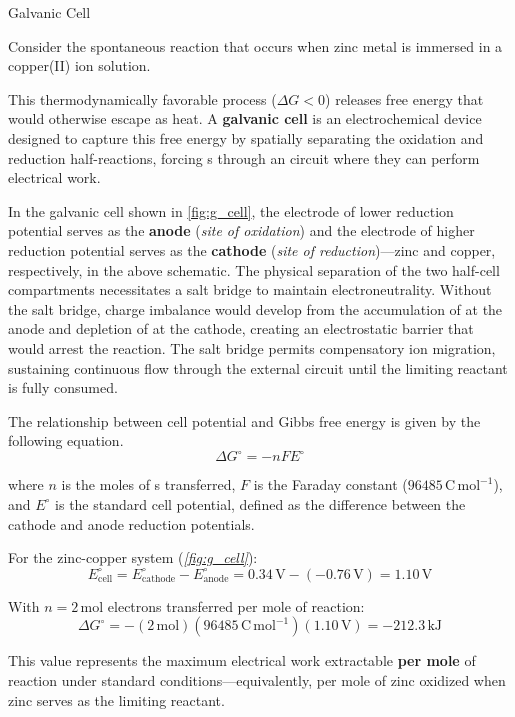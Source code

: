\documentclass[10pt]{article}
\begin{document}
    \begin{core}[label=core:galvanic]{Galvanic Cell}

      Consider the spontaneous reaction that occurs when zinc metal is immersed in a copper(II) ion solution.


      This thermodynamically favorable process ($\Delta G < 0$) releases free energy that would otherwise escape as heat. A \textbf{galvanic cell} is an electrochemical device designed to capture this free energy by spatially separating the oxidation and reduction half-reactions, forcing s through an circuit where they can perform electrical work.


      In the galvanic cell shown in \autoref{fig:g_cell}, the electrode of lower reduction potential serves as the \textbf{anode} (\textit{site of oxidation}) and the electrode of higher reduction potential serves as the \textbf{cathode} (\textit{site of reduction})---zinc and copper, respectively, in the above schematic. The physical separation of the two half-cell compartments necessitates a salt bridge to maintain electroneutrality. Without the salt bridge, charge imbalance would develop from the accumulation of  at the anode and depletion of  at the cathode, creating an electrostatic barrier that would arrest the reaction. The salt bridge permits compensatory ion migration, sustaining continuous  flow through the external circuit until the limiting reactant is fully consumed.

      The relationship between cell potential and Gibbs free energy is given by the following equation.
      \[
        \Delta G^{\circ} = -nFE^{\circ}
      \]

      where $n$ is the moles of s transferred, $F$ is the Faraday constant ($96485\,\text{C}\,\text{mol}^{-1}$), and $E^{\circ}$ is the standard cell potential, defined as the difference between the cathode and anode reduction potentials.

      For the zinc-copper system (\textit{\autoref{fig:g_cell}}):
      \[
        E^{\circ}_{\text{cell}} = E^{\circ}_{\text{cathode}} - E^{\circ}_{\text{anode}} = 0.34\,\text{V} - (-0.76\,\text{V}) = 1.10\,\text{V}
      \]

      With $n = 2\,\text{mol}$ electrons transferred per mole of reaction:
      \[
        \Delta G^{\circ} = -(2\,\text{mol})(96485\,\text{C}\,\text{mol}^{-1})(1.10\,\text{V}) = -212.3\,\text{kJ}
      \]

      This value represents the maximum electrical work extractable \textbf{per mole} of reaction under standard conditions---equivalently, per mole of zinc oxidized when zinc serves as the limiting reactant.

    \end{core}
\end{document}
